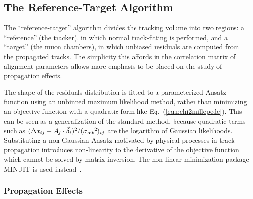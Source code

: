 \subsection{The Reference-Target Algorithm}
\label{sec:rtalgo}

The ``reference-target'' algorithm divides the tracking volume into two
regions: a ``reference'' (the tracker), in which normal track-fitting is
performed, and a ``target'' (the muon chambers), in which unbiased
residuals are computed from the propagated tracks.  The simplicity
this affords in the correlation matrix of alignment parameters allows
more emphasis to be placed on the study of propagation effects.

The shape of the residuals distribution is fitted to a parameterized
Ansatz function using an unbinned maximum likelihood method, rather than
minimizing an objective function with a quadratic form like
Eq.~(\ref{eqn:chi2millepede}).  This can be seen as a
generalization of the standard method, because quadratic terms such as
$(\Delta x_{ij} -
A_j \cdot \vec{\delta}_i)^2/({\sigma_{\mbox{\scriptsize hit}}}^2)_{ij}$
are the logarithm of Gaussian likelihoods.  Substituting a
non-Gaussian Ansatz motivated by physical processes in track
propagation introduces non-linearity to the derivative of the
objective function which cannot be solved by matrix inversion.  
The non-linear minimization package MINUIT is used instead~\cite{James:1975dr}.

\subsubsection{Propagation Effects}

